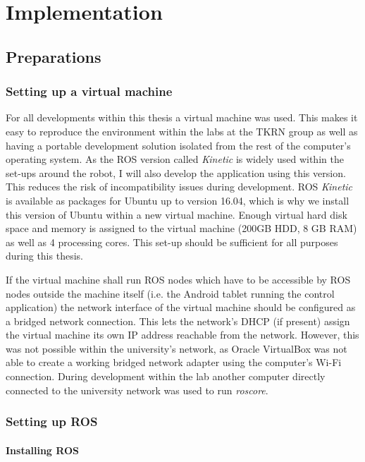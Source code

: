 \chapter{Implementation}
\label{chap:implementation}
\section{Preparations}
\subsection{Setting up a virtual machine}

For all developments within this thesis a virtual machine was used. This makes it easy to reproduce the environment within the labs at the TKRN group as well as having a portable development solution isolated from the rest of the computer's operating system. As the ROS version called \textit{Kinetic} is widely used within the set-ups around the robot, I will also develop the application using this version. This reduces the risk of incompatibility issues during development. ROS \textit{Kinetic} is available as packages for Ubuntu up to version 16.04\cite{ros:install}, which is why we install this version of Ubuntu within a new virtual machine. Enough virtual hard disk space and memory is assigned to the virtual machine (200GB HDD, 8 GB RAM) as well as 4 processing cores. This set-up should be sufficient for all purposes during this thesis. 

If the virtual machine shall run ROS nodes which have to be accessible by ROS nodes outside the machine itself (i.e. the Android tablet running the control application) the network interface of the virtual machine should be configured as a bridged network connection. This lets the network's DHCP (if present) assign the virtual machine its own IP address reachable from the network. However, this was not possible within the university's network, as Oracle VirtualBox was not able to create a working bridged network adapter using the computer's Wi-Fi connection. During development within the lab another computer directly connected to the university network was used to run \textit{roscore}.

\subsection{Setting up ROS}

\subsubsection{Installing ROS}


